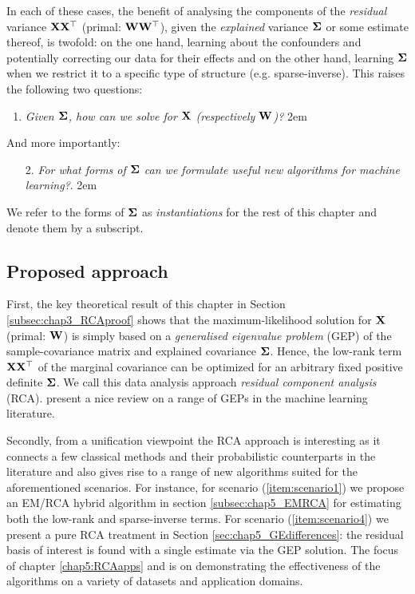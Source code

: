       In each of these cases, the benefit of analysing the components of the \textit{residual} variance $\mathbf{X}\mathbf{X}^\top$ (primal: $\mathbf{W}\mathbf{W}^\top$), given the \textit{explained} variance $\mathbf{\Sigma}$ or some estimate thereof, is twofold: on the one hand, learning about the confounders and potentially correcting our data for their effects and on the other hand, learning $\mathbf{\Sigma}$ when we restrict it to a specific type of structure (e.g. sparse-inverse). This raises the following two questions:
      \begin{enumerate}
	\item \textit{Given $\mathbf{\Sigma}$, how can we solve for $\mathbf{X}$ (respectively $\mathbf{W}$)?}
	\rightskip2em
      \end{enumerate}
      And more importantly:
      \begin{enumerate}
	\item[2.] \textit{For what forms of $\mathbf{\Sigma}$ can we formulate useful new algorithms for machine learning?}.
	\rightskip2em
      \end{enumerate}
      We refer to the forms of $\mathbf{\Sigma}$ as \textit{instantiations} for the rest of this chapter and denote them by a subscript.


    \subsection{Proposed approach} \label{subsec:chap3_approach}
      First, the key theoretical result of this chapter in Section \ref{subsec:chap3_RCAproof} shows that the maximum-likelihood solution for $\mathbf{X}$ (primal: $\mathbf{W}$) is simply based on a \textit{generalised eigenvalue problem} (GEP) of the sample-covariance matrix and explained covariance $\mathbf{\Sigma}$. Hence, the low-rank term $\mathbf{X}\mathbf{X}^\top$ of the marginal covariance can be optimized for an arbitrary fixed positive definite $\mathbf{\Sigma}$. We call this data analysis approach \textit{residual component analysis} (RCA). \citet{DeBie:eigenproblems05} present a nice review on a range of GEPs in the machine learning literature.

      Secondly, from a unification viewpoint the RCA approach is interesting as it connects a few classical methods and their probabilistic counterparts in the literature and also gives rise to a range of new algorithms suited for the aforementioned scenarios. For instance, for scenario (\ref{item:scenario1}) we propose an EM/RCA hybrid algorithm in section \ref{subsec:chap5_EMRCA} for estimating both the low-rank and sparse-inverse terms. For scenario (\ref{item:scenario4}) we present a pure RCA treatment in Section \ref{sec:chap5_GEdifferences}: the residual basis of interest is found with a single estimate via the GEP solution. The focus of chapter \ref{chap5:RCAapps} and is on demonstrating the effectiveness of the algorithms on a variety of datasets and application domains.

